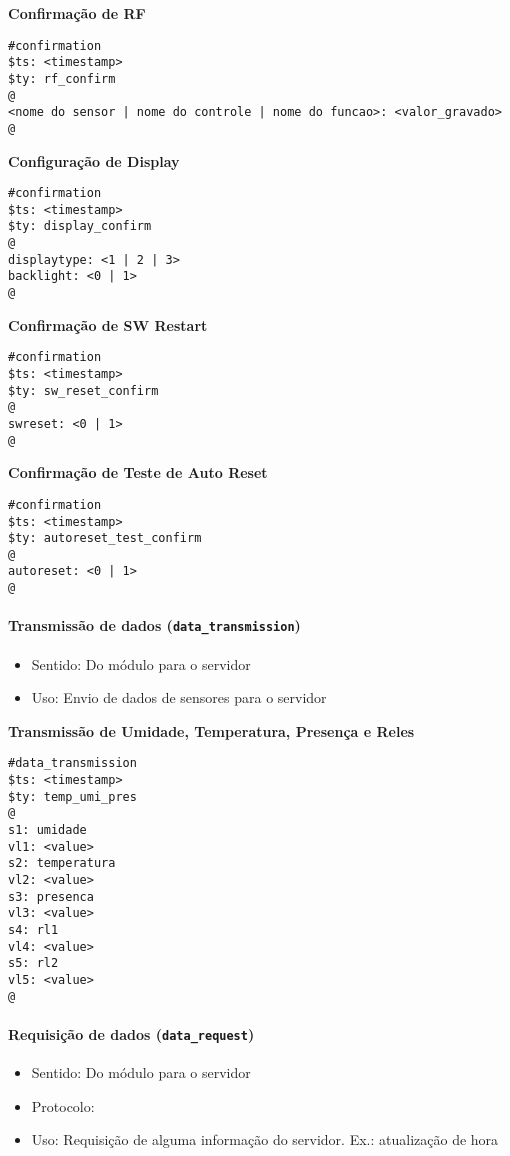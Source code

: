 \textbf{Confirmação de RF}
\begin{lstlisting}
#confirmation
$ts: <timestamp>
$ty: rf_confirm
@
<nome do sensor | nome do controle | nome do funcao>: <valor_gravado>
@
\end{lstlisting}

\textbf{Configuração de Display}
\begin{lstlisting}
#confirmation
$ts: <timestamp>
$ty: display_confirm
@
displaytype: <1 | 2 | 3>
backlight: <0 | 1>
@
\end{lstlisting}

\textbf{Confirmação de SW Restart}
\begin{lstlisting}
#confirmation
$ts: <timestamp>
$ty: sw_reset_confirm
@
swreset: <0 | 1>
@
\end{lstlisting}

\textbf{Confirmação de Teste de Auto Reset}
\begin{lstlisting}
#confirmation
$ts: <timestamp>
$ty: autoreset_test_confirm
@
autoreset: <0 | 1>
@
\end{lstlisting}

\paragraph{Transmissão de dados (\texttt{data\_transmission})}
\begin{itemize}
\item Sentido: Do módulo para o servidor
\item Uso: Envio de dados de sensores para o servidor
\end{itemize}

\textbf{Transmissão de Umidade, Temperatura, Presença e Reles}
\begin{lstlisting}
#data_transmission
$ts: <timestamp>
$ty: temp_umi_pres
@
s1: umidade
vl1: <value>
s2: temperatura
vl2: <value>
s3: presenca
vl3: <value>
s4: rl1
vl4: <value>
s5: rl2
vl5: <value>
@
\end{lstlisting}

\paragraph{Requisição de dados (\texttt{data\_request})}
\begin{itemize}
\item Sentido: Do módulo para o servidor
\item Protocolo: \wmqtt{}
\item Uso: Requisição de alguma informação do servidor. Ex.: atualização de hora
\end{itemize}



